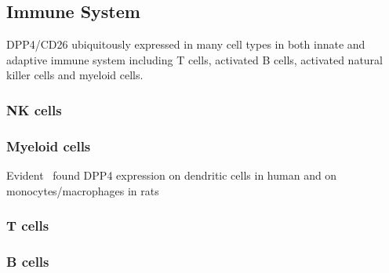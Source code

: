 \subsection{Immune System}
DPP4/CD26 ubiquitously expressed in many cell types in both innate and adaptive immune system including T cells, activated B cells, activated natural killer cells and myeloid cells.~\cite{Abbott1994,Shingu2003,Hong1989,Gutschmidt1981,Dikov2004,Bühling1995,Tanaka1992,Gorrell1991}  

\subsubsection{NK cells}

\subsubsection{Myeloid cells}
Evident~\cite{Zhong2013,Gliddon2002} found DPP4 expression on dendritic cells in human and on monocytes/macrophages in rats~\cite{Epardaud2004}

\subsubsection{T cells}
\subsubsection{B cells}
